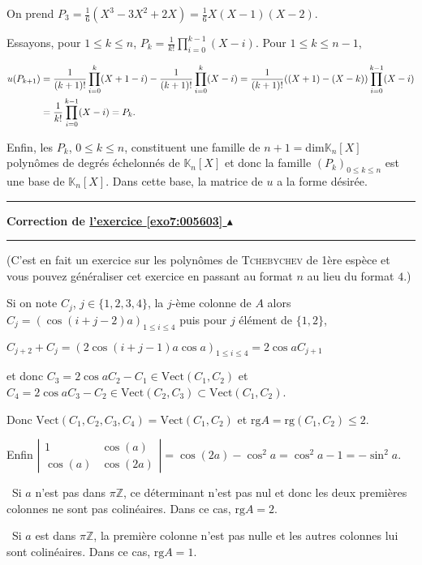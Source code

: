\documentclass[11pt,a4paper]{article}
\newcommand{\Zz}{\mathbb{Z}} \newcommand{\Z}{\mathbb{Z}}
\newcommand{\Kk}{\mathbb{K}} \newcommand{\K}{\mathbb{K}}
\newcounter{exo}
\newcommand{\correction}[1]{\hypertarget{cor7:#1}{}\label{cor7:#1}{\bf Correction de \hyperlink{exo7:#1}{l'exercice \ref{exo7:#1} $\blacktriangle$}}\vspace{1mm}\hrule\vspace{1mm}}
\newcommand{\fincorrection}{\vspace{1mm}\hrule\vspace*{7mm}}
\begin{document}
\begin{enumerate}
On prend $P_3=\frac{1}{6}(X^3-3X^2+2X)=\frac{1}{6}X(X-1)(X-2)$.

Essayons, pour $1\leqslant k\leqslant n$, $P_k=\frac{1}{k!}\prod_{i=0}^{k-1}(X-i)$. Pour $1\leqslant k\leqslant n-1$,

\begin{align*}\ensuremath
u(P_{k+1})&=\frac{1}{(k+1)!}\prod_{i=0}^{k}(X+1-i)-\frac{1}{(k+1)!}\prod_{i=0}^{k}(X-i)=\frac{1}{(k+1)!}((X+1)-(X-k))\prod_{i=0}^{k-1}(X-i)\\
 &=\frac{1}{k!}\prod_{i=0}^{k-1}(X-i)=P_k.
\end{align*}

Enfin, les $P_k$, $0\leqslant k\leqslant n$, constituent une famille de $n+1=\text{dim}\Kk_n[X]$ polynômes de degrés échelonnés de $\Kk_n[X]$ et donc la famille $(P_k)_{0\leqslant k\leqslant n}$ est une base de $\Kk_n[X]$. Dans cette base, la matrice de $u$ a la forme désirée.
\end{enumerate}
\fincorrection
\correction{005603}
(C'est en fait un exercice sur les polynômes de \textsc{Tchebychev} de 1ère espèce et vous pouvez généraliser cet exercice en passant au format $n$ au lieu du format $4$.)

Si on note $C_j$, $j\in\{1,2,3,4\}$, la $j$-ème colonne de $A$ alors $C_j= (\cos(i+j-2)a)_{1\leqslant i\leqslant4}$ puis pour $j$ élément de $\{1,2\}$, 

\begin{center}
$C_{j+2}+ C_j =(2\cos(i+j-1)a\cos a)_{1\leqslant i\leqslant4}= 2\cos aC_{j+1}$
\end{center}

et donc $C_3 =2\cos aC_2 - C_1\in\text{Vect}(C_1,C_2)$ et $C_4= 2\cos a C_3 -C_2\in\text{Vect}(C_2,C_3)\subset\text{Vect}(C_1,C_2)$.

Donc $\text{Vect}(C_1,C_2,C_3,C_4)=\text{Vect}(C_1,C_2)$ et $\text{rg}A=\text{rg}(C_1,C_2)\leqslant 2$.

Enfin $\left|
\begin{array}{cc}
1&\cos(a)\\
\cos(a)&\cos(2a)
\end{array}
\right|=\cos(2a) -\cos^2a=\cos^2a - 1= -\sin^2a$.

\textbullet~Si $a$ n'est pas dans $\pi\Zz$, ce déterminant n'est pas nul et donc les deux premières colonnes ne sont pas colinéaires. Dans ce cas, $\text{rg}A = 2$. 

\textbullet~Si $a$ est dans $\pi\Zz$, la première colonne n'est pas nulle et les autres colonnes lui sont colinéaires. Dans ce cas, $\text{rg}A = 1$.
\end{document}
